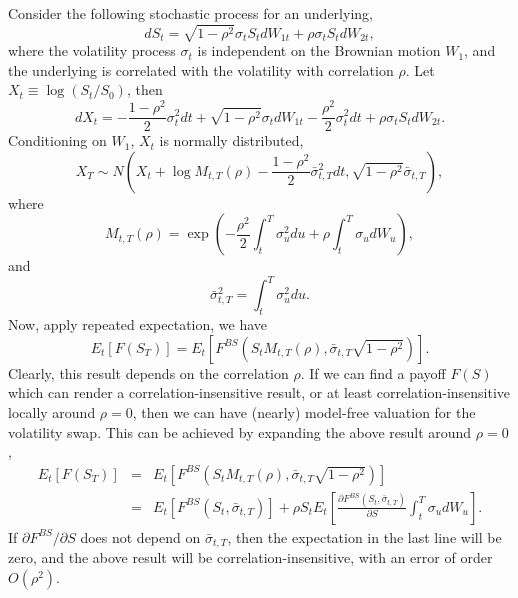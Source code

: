 \documentclass[12pt]{article}
\begin{document}
    Consider the following stochastic process for an underlying,
    \begin{equation}
      dS_t=\sqrt{1-\rho^2}\sigma_tS_tdW_{1t}+\rho\sigma_tS_tdW_{2t},
    \end{equation}
    where the volatility process $\sigma_t$ is independent on the Brownian motion $W_1$, and the underlying is correlated
    with the volatility with correlation $\rho$. Let $X_t\equiv\log(S_t/S_0)$, then
    \begin{equation}
      dX_t=-\frac{1-\rho^2}{2}\sigma_t^2dt+\sqrt{1-\rho^2}\sigma_tdW_{1t}-\frac{\rho^2}{2}\sigma_t^2dt+\rho\sigma_tS_tdW_{2t}.
    \end{equation}
    Conditioning on $W_1$, $X_t$ is normally distributed,
    \begin{equation}
      X_T\sim N\left(X_t+\log M_{t,T}(\rho)-\frac{1-\rho^2}{2}\bar\sigma_{t,T}^2dt, \sqrt{1-\rho^2}\bar\sigma_{t,T}\right),
    \end{equation}
    where
    \begin{equation}
      M_{t,T}(\rho) = \exp\left(-\frac{\rho^2}{2}\int_t^T\sigma_u^2du+\rho\int_t^T\sigma_udW_u\right),
    \end{equation}
    and
    \begin{equation}
      \bar\sigma_{t,T}^2=\int_t^T\sigma_u^2du.
    \end{equation}
    Now, apply repeated expectation, we have
    \begin{equation}
      E_t\left[F(S_T)\right]=E_t\left[F^{BS}\left(S_tM_{t,T}(\rho),\bar\sigma_{t,T}\sqrt{1-\rho^2}\right)\right].
    \end{equation}
    Clearly, this result depends on the correlation $\rho$. If we can find a payoff $F(S)$ which can render a correlation-insensitive
    result, or at least correlation-insensitive locally around $\rho=0$, then we can have (nearly) model-free valuation for the volatility
    swap. This can be achieved by expanding the above result around $\rho=0$,
    \begin{eqnarray}
             E_t\left[F(S_T)\right]
      &=&E_t\left[F^{BS}\left(S_tM_{t,T}(\rho),\bar\sigma_{t,T}\sqrt{1-\rho^2}\right)\right]\nonumber\\
      &=&E_t\left[F^{BS}(S_t,\bar\sigma_{t,T})\right]
              + \rho S_tE_t\left[\frac{\partial F^{BS}(S_t,\bar\sigma_{t,T})}{\partial S}
                              \int_t^T\sigma_udW_u\right].
    \end{eqnarray}
    If $\partial F^{BS}/\partial S$ does not depend on $\bar\sigma_{t,T}$, then the expectation in the last line will be zero,
    and the above result will be correlation-insensitive, with an error of order $O(\rho^2)$.
\end{document}
